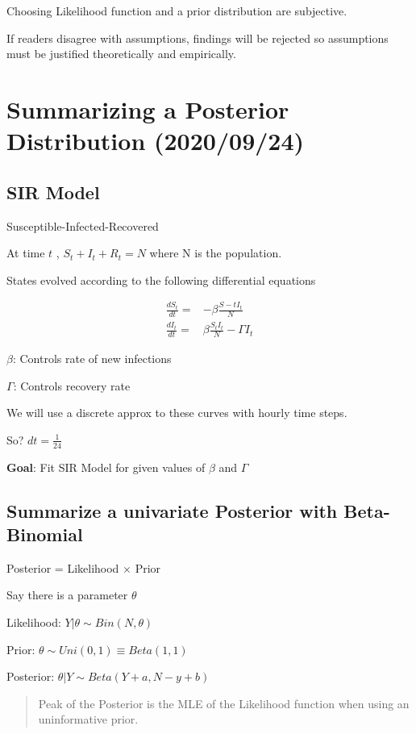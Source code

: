 \documentclass[11pt]{article}
\begin{document}
Choosing Likelihood function and a prior distribution are subjective.

If readers disagree with assumptions, findings will be rejected so assumptions
must be justified theoretically and empirically.
\section{Summarizing a Posterior Distribution (2020/09/24)}
\label{sec:org661384a}

\subsection{SIR Model}
\label{sec:orge2ff6c3}
Susceptible-Infected-Recovered

At time \(t\) , \(S_t + I_t + R_t = N\) where N is the population.

States evolved according to the following differential equations

\begin{equation}
\begin{split}
\frac{d S_t}{d t} = & -\beta \frac{S-t I_t}{N}\\
\frac{d I_t}{d t} = & \beta \frac{S_t I_t}{N} - \Gamma I_t
\end{split}
\end{equation}

\(\beta\): Controls rate of new infections

\(\Gamma\): Controls recovery rate

We will use a discrete approx to these curves with hourly time steps.

So? \(dt = \frac{1}{24}\)

\textbf{Goal}: Fit SIR Model for given values of \(\beta\) and \(\Gamma\)

\subsection{Summarize a univariate Posterior with Beta-Binomial}
\label{sec:org8a38165}

Posterior = Likelihood \(\times\) Prior

Say there is a parameter \(\theta\)

Likelihood: \(Y | \theta \sim Bin(N, \theta)\)

Prior: \(\theta \sim Uni(0, 1) \equiv Beta(1,1)\)

Posterior: \(\theta | Y \sim Beta(Y + a, N - y + b)\)

\begin{quote}
Peak of the Posterior is the MLE of the Likelihood function when using an
uninformative prior.
\end{quote}
\end{document}
